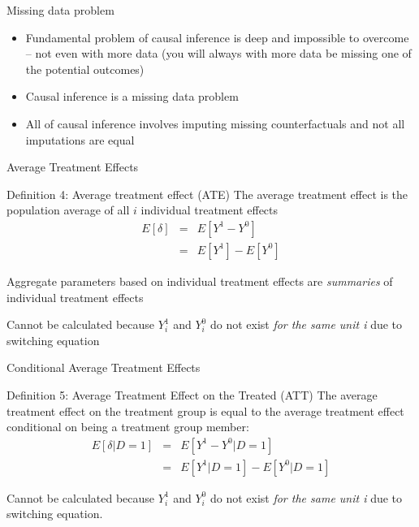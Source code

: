 \documentclass{beamer}
\begin{document}
\begin{frame}{Missing data problem}


    
      \begin{itemize}
    \item Fundamental problem of causal inference is deep and impossible to overcome -- not even with more data (you will always with more data be missing one of the potential outcomes)
    \item Causal inference is a missing data problem 
    \item All of causal inference involves imputing missing counterfactuals and not all imputations are equal
  \end{itemize}

    
\end{frame}




\begin{frame}{Average Treatment Effects}

  \begin{block}{Definition 4: Average treatment effect (ATE)}
    The average treatment effect is the population average of all $i$ individual treatment effects
    \begin{eqnarray*}
      E[\delta]&=&E[Y^1-Y^0]\\
      &=&E[Y^1] - E[Y^0]
    \end{eqnarray*}
  \end{block}

  \bigskip

Aggregate parameters based on individual treatment effects are \emph{summaries} of individual treatment effects

\bigskip

  Cannot be calculated because $Y^1_i$ and $Y^0_i$ do not exist \emph{for the same unit i} due to switching equation

\end{frame}



\begin{frame}{Conditional Average Treatment Effects}


  \begin{block}{Definition 5: Average Treatment Effect on the Treated (ATT)}
    The average treatment effect on the treatment group is equal to the average treatment effect conditional on being a treatment group member:
    \begin{eqnarray*}
      E[\delta|D=1]&=&E[Y^1-Y^0|D=1] \nonumber \\
      &=&E[Y^1|D=1]-E[Y^0|D=1]
    \end{eqnarray*}
  \end{block}
  Cannot be calculated because $Y^1_i$ and $Y^0_i$ do not exist \emph{for the same unit i} due to switching equation. 


\end{frame}
\end{document}
